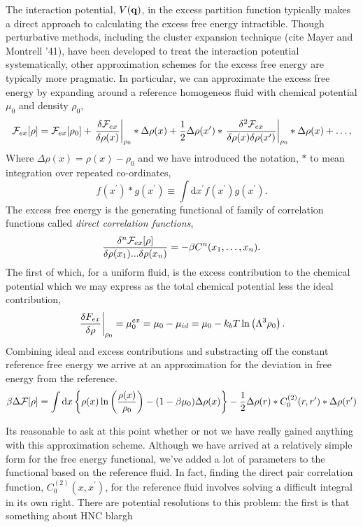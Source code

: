 The interaction potential, $V(\mathbf{q})$, in the excess partition function typically makes a direct approach to calculating the excess free energy intractible.
Though perturbative methods, including the cluster expansion technique (cite Mayer and Montrell '41), have been developed to treat the interaction potential systematically, other approximation schemes for the excess free energy are typically more pragmatic.
In particular, we can approximate the excess free energy by expanding around a reference homogeneos fluid with chemical potential $\mu_0$ and density $\rho_0$,
%
\begin{equation}
    \mathcal{F}_{ex}[\rho] = \mathcal{F}_{ex}[\rho_0] 
        + \left . \frac{\delta \mathcal{F}_{ex}}{\delta \rho(x)} \right\vert_{\rho_0} \ast \Delta\rho(x) 
        + \frac{1}{2} \Delta\rho(x^\prime) \ast 
            \left . \frac{\delta^2 \mathcal{F}_{ex}}{\delta\rho(x)\delta\rho(x^\prime)} \right\vert_{\rho_0} 
            \ast \Delta\rho(x) + \dots,
\end{equation}
%
Where $\Delta\rho(x) = \rho(x) - \rho_0$ and we have introduced the notation, $\ast$ to mean integration over repeated co-ordinates,
%
\begin{equation}
    f(x^\prime) \ast g(x^\prime) \equiv \int\mathrm{d}x^\prime f(x^\prime) g(x^\prime).
\end{equation}
%
The excess free energy is the generating functional of family of correlation functions called \textit{direct correlation functions}, 
%
\begin{equation}
    \frac{\delta^n \mathcal{F}_{ex}[\rho]}{\delta \rho(x_1) ... \delta \rho(x_n)} = -\beta C^{n}(x_1, \dots, x_n).
\end{equation}
%
The first of which, for a uniform fluid, is the excess contribution to the chemical potential which we may express as the total chemical potential less the ideal contribution, 
%
\begin{equation}
    \left.\frac{\delta F_{ex}}{\delta \rho}\right\vert_{\rho_0} = \mu_0^{ex} = \mu_0 - \mu_{id} = \mu_0 - k_bT\ln\left(\Lambda^3 \rho_0\right).
\end{equation}
%
Combining ideal and excess contributions and substracting off the constant reference free energy we arrive at an approximation for the deviation in free energy from the reference. 
%
\begin{equation}
    \beta \Delta \mathcal{F} [\rho] = 
        \int \mathrm{d}x \left\lbrace \rho(x) \ln\left(\frac{\rho(x)}{\rho_0} \right) -(1-\beta\mu_0) \Delta \rho(x)\right\rbrace
        - \frac{1}{2}\Delta \rho(r) \ast C_0^{(2)}(r, r^\prime) \ast \Delta \rho(r^\prime)
\end{equation}

Its reasonable to ask at this point whether or not we have really gained anything with this approximation scheme.
Although we have arrived at a relatively simple form for the free energy functional, we've added a lot of parameters to the functional based on the reference fluid.
In fact, finding the direct pair correlation function, $C_0^{(2)}(x, x^\prime)$, for the reference fluid involves solving a difficult integral in its own right.
There are potential resolutions to this problem: the first is that something about HNC blargh